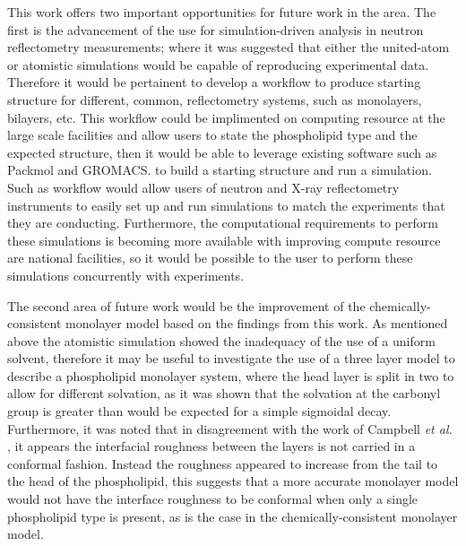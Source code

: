 This work offers two important opportunities for future work in the area.
The first is the advancement of the use for simulation-driven analysis in neutron reflectometry measurements; where it was suggested that either the united-atom or atomistic simulations would be capable of reproducing experimental data.
Therefore it would be pertainent to develop a workflow to produce starting structure for different, common, reflectometry systems, such as monolayers, bilayers, etc.
This workflow could be implimented on computing resource at the large scale facilities and allow users to state the phospholipid type and the expected structure, then it would be able to leverage existing software such as Packmol and GROMACS.\autocite[in a similar fashion the building of a monolayer in this work]{martinez_packmol_2009,lindahl_gromacs_2001} to build a starting structure and run a simulation.
Such as workflow would allow users of neutron and X-ray reflectometry instruments to easily set up and run simulations to match the experiments that they are conducting.
Furthermore, the computational requirements to perform these simulations is becoming more available with improving compute resource are national facilities, so it would be possible to the user to perform these simulations concurrently with experiments.

The second area of future work would be the improvement of the chemically-consistent monolayer model based on the findings from this work.
As mentioned above the atomistic simulation showed the inadequacy of the use of a uniform solvent, therefore it may be useful to investigate the use of a three layer model to describe a phospholipid monolayer system, where the head layer is split in two to allow for different solvation, as it was shown that the solvation at the carbonyl group is greater than would be expected for a simple sigmoidal decay.
Furthermore, it was noted that in disagreement with the work of Campbell \emph{et al.} \cite{campbell_structure_2018}, it appears the interfacial roughness between the layers is not carried in a conformal fashion.
Instead the roughness appeared to increase from the tail to the head of the phospholipid, this suggests that a more accurate monolayer model would not have the interface roughness to be conformal when only a single phospholipid type is present, as is the case in the chemically-consistent monolayer model.

